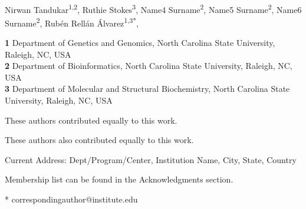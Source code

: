 \documentclass[10pt,letterpaper]{article}
\begin{document}
\vspace*{0.2in}

\begin{flushleft}
{\Large
\textbf{} %
}
\newline
\\
Nirwan Tandukar\textsuperscript{1,2\Yinyang},
Ruthie Stokes\textsuperscript{3},
Name4 Surname\textsuperscript{2},
Name5 Surname\textsuperscript{2\ddag},
Name6 Surname\textsuperscript{2\ddag},
Rubén Rellán Álvarez\textsuperscript{1,3*},

\bigskip
\textbf{1} Department of Genetics and Genomics, North Carolina State University, Raleigh, NC, USA
\\
\textbf{2} Department of Bioinformatics, North Carolina State University, Raleigh, NC, USA
\\
\textbf{3} Department of Molecular and Structural Biochemistry,  North Carolina State University, Raleigh, NC, USA
\\
\bigskip


% 
%
\Yinyang These authors contributed equally to this work.

\ddag These authors also contributed equally to this work.

\textcurrency Current Address: Dept/Program/Center, Institution Name, City, State, Country %



\textpilcrow Membership list can be found in the Acknowledgments section.

* correspondingauthor@institute.edu

\end{flushleft}
\end{document}
